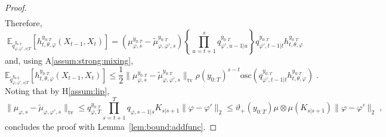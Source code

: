 \documentclass{article}
\newcommand{\udupvar}{\vartheta_+}
\newcommand{\1}{\mathbbm{1}}
\newcommand{\eqsp}{\;}
\begin{document}
\begin{proof}
\begin{align*}
\end{align*}
Therefore,
$$
\mathbb{E}_{\tilde q^{y_{0:T}}_{\varphi,\varphi',s|T}}\left[h^{y_{0:T}}_{t,\theta,\varphi}(X_{t-1},X_t)\right] = \left(\mu^{y_{0:T}}_{\varphi,s} - \tilde\mu^{y_{0:T}}_{\varphi,\varphi',s}\right)\left\{\prod_{u=t+1}^{s}q^{y_{0:T}}_{\varphi',u-1|u}\right\}q^{y_{0:T}}_{\varphi',t-1|t}h^{y_{0:T}}_{t,\theta,\varphi}
$$
and, using A\ref{assum:strong:mixing},
$$
\mathbb{E}_{\tilde q^{y_{0:T}}_{\varphi,\varphi',s|T}}\left[h^{y_{0:T}}_{t,\theta,\varphi}(X_{t-1},X_t)\right]  \leq \frac{1}{2}\|\mu^{y_{0:T}}_{\varphi,s}-\tilde\mu^{y_{0:T}}_{\varphi,\varphi',s}\|_{\mathrm{tv}}\rho(y_{0:T})^{s-t}\mathrm{osc}\left(q^{y_{0:T}}_{\varphi',t-1|t}h^{y_{0:T}}_{t,\theta,\varphi}\right)\eqsp.
$$
Noting that by H\ref{assum:lip},
$$
\|\mu_{\varphi,s}-\tilde\mu_{\varphi,\varphi',s}\|_{\mathrm{tv}} \leq q^{y_{0:T}}_{\varphi,T}\prod_{s=t+1}^Tq_{\varphi,s-1|s}K_{s|s+1}\|\varphi-\varphi'\|_2\leq \udupvar(y_{0:T})\mu\otimes\mu (K_{s|s+1})\|\varphi-\varphi'\|_2\eqsp,
$$
concludes the proof with Lemma~\ref{lem:bound:addfunc}.
\end{proof}
\end{document}
